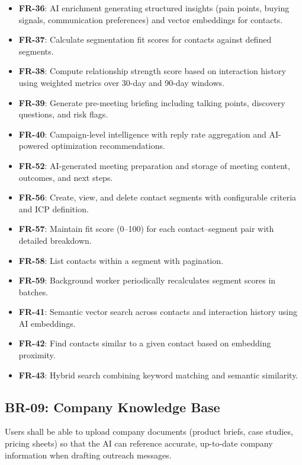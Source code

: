 \documentclass[a4paper]{article}
\begin{document}
\begin{itemize}
    \item \textbf{FR-36}: AI enrichment generating structured
    insights (pain points, buying signals, communication
    preferences) and vector embeddings for contacts.
    \item \textbf{FR-37}: Calculate segmentation fit scores for
    contacts against defined segments.
    \item \textbf{FR-38}: Compute relationship strength score based
    on interaction history using weighted metrics over 30-day and
    90-day windows.
    \item \textbf{FR-39}: Generate pre-meeting briefing including
    talking points, discovery questions, and risk flags.
    \item \textbf{FR-40}: Campaign-level intelligence with reply
    rate aggregation and AI-powered optimization recommendations.
    \item \textbf{FR-52}: AI-generated meeting preparation and
    storage of meeting content, outcomes, and next steps.
    \item \textbf{FR-56}: Create, view, and delete contact segments
    with configurable criteria and ICP definition.
    \item \textbf{FR-57}: Maintain fit score (0--100) for each
    contact--segment pair with detailed breakdown.
    \item \textbf{FR-58}: List contacts within a segment with
    pagination.
    \item \textbf{FR-59}: Background worker periodically
    recalculates segment scores in batches.
    \item \textbf{FR-41}: Semantic vector search across contacts
    and interaction history using AI embeddings.
    \item \textbf{FR-42}: Find contacts similar to a given contact
    based on embedding proximity.
    \item \textbf{FR-43}: Hybrid search combining keyword matching
    and semantic similarity.
\end{itemize}

\subsection{BR-09: Company Knowledge Base}

Users shall be able to upload company documents (product briefs,
case studies, pricing sheets) so that the AI can reference accurate,
up-to-date company information when drafting outreach messages.
\end{document}

